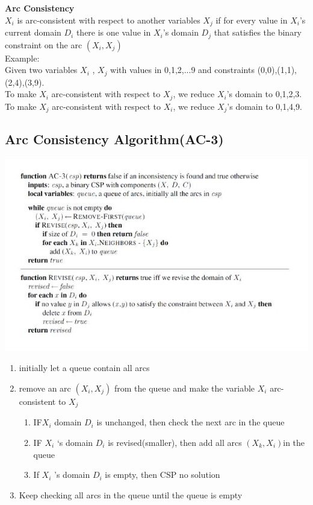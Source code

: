 \textbf{Arc Consistency}\\
$X_i$ is arc-consistent with respect to another variables $X_j$ if for every value in $X_i$’s current domain $D_i$ there is one value in $X_i$’s domain $D_j$ that satisfies the binary constraint on the arc $(X_i , X_j)$\\[3ex]

Example:\\
Given two variables $X_i$ , $X_j$ with values in {0,1,2,...9} and constraints 
(0,0),(1,1),(2,4),(3,9).\\
To make $X_i$ arc-consistent with respect to $X_j$, we reduce $X_i$’s domain to {0,1,2,3}.\\
To make $X_j$ arc-consistent with respect to $X_i$, we reduce $X_j$’s domain to {0,1,4,9}.\\

\subsection{Arc Consistency Algorithm(AC-3)}
\includegraphics[scale=1]{chap1_pics/1nAyMlelLl-LW-ECO-Akl5AsNAugdRshrNF4o7Q.png} 
\begin{enumerate}
\item initially let a queue contain all arcs
\item remove an arc $(X_i , X_j)$ from the queue and make the variable $X_i$ arc-consistent to $X_j$
\begin{enumerate}
\item IF$ X_i$ domain $D_i$ is unchanged, then check the next arc in the queue
\item IF $X_i$ ‘s domain $D_i$ is revised(smaller), then add all arcs $(X_k, X_i) $in the queue 
\item If $X_i$ ’s domain $D_i$ is empty, then CSP no solution
\end{enumerate}
\item Keep checking all arcs in the queue until the queue is empty 
\end{enumerate}

